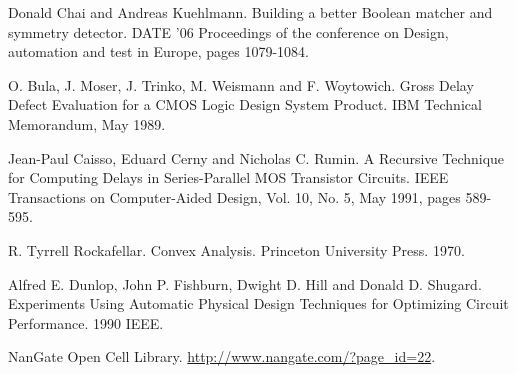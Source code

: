 \documentclass{tfg}
\begin{document}
\begin{thebibliography}{9}
Donald Chai and Andreas Kuehlmann. Building a better Boolean matcher and symmetry detector. DATE '06 Proceedings of the conference on Design, automation and test in Europe, pages 1079-1084. 

O. Bula, J. Moser, J. Trinko, M. Weismann and F. Woytowich. Gross Delay Defect Evaluation for a CMOS Logic Design System Product. IBM Technical Memorandum, May 1989.

Jean-Paul Caisso, Eduard Cerny and Nicholas C. Rumin. A Recursive Technique for Computing Delays in Series-Parallel MOS Transistor Circuits. IEEE Transactions on Computer-Aided Design, Vol. 10, No. 5, May 1991, pages 589-595.

R. Tyrrell Rockafellar. Convex Analysis. Princeton University Press. 1970.

Alfred E. Dunlop, John P. Fishburn, Dwight D. Hill and Donald D. Shugard. Experiments Using Automatic Physical Design Techniques for Optimizing Circuit Performance. 1990 IEEE.

NanGate Open Cell Library. \url{http://www.nangate.com/?page_id=22}.
\end{thebibliography}

%
\end{document}
